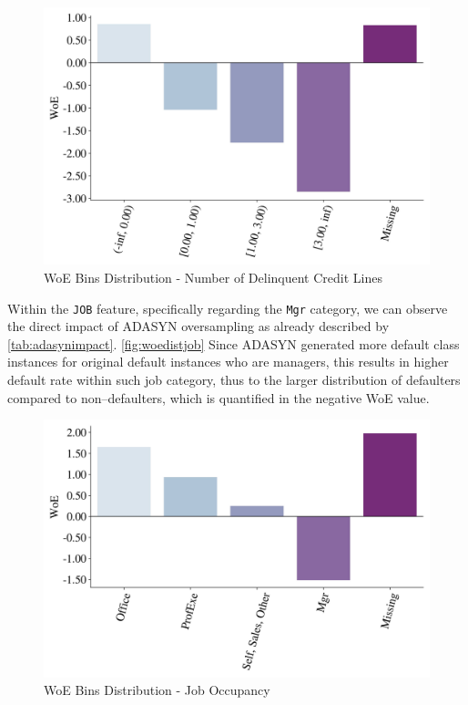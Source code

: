 \begin{figure}[H]
    \centering
    \caption{WoE Bins Distribution - Number of Delinquent Credit Lines}\vspace{0.5em}
    \label{fig:woedistdelinq}
    \includegraphics[width=120mm]{Figures/WoE_Distribution_DELINQ.jpg}
    
    \vspace{-1em}
\end{figure}

Within the \texttt{JOB} feature, specifically regarding the \texttt{Mgr} category, we can observe the direct impact of ADASYN oversampling as already described by \autoref{tab:adasynimpact}. \autoref{fig:woedistjob}
Since ADASYN generated more default class instances for original default instances who are managers, this results in higher default rate within such job category, thus to the larger distribution of defaulters compared to non--defaulters, which is quantified in the negative WoE value.



\begin{figure}[H]
    \centering
    \caption{WoE Bins Distribution - Job Occupancy}\vspace{0.5em}
    \label{fig:woedistjob}
    \includegraphics[width=120mm]{Figures/WoE_Distribution_JOB.jpg}
    
    \vspace{-1em}
\end{figure}

